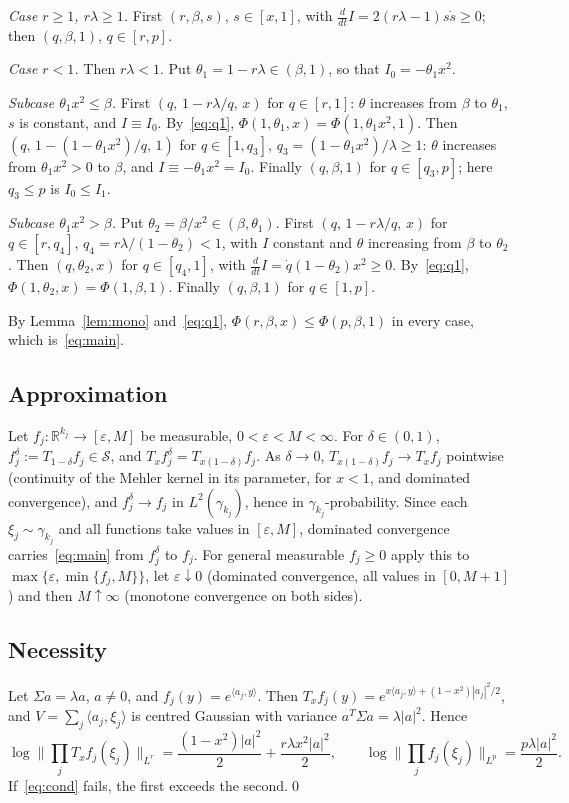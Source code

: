 \documentclass[11pt]{amsart}
\theoremstyle{definition}
\newcommand{\R}{\mathbb{R}}
\newcommand{\cS}{\mathcal{S}}
\begin{document}
\emph{Case $r\ge1$, $r\lambda\ge1$.} First $(r,\beta,s)$, $s\in[x,1]$, with $\frac{d}{dt}I=2(r\lambda-1)s\dot s\ge0$;
then $(q,\beta,1)$, $q\in[r,p]$.

\emph{Case $r<1$.} Then $r\lambda<1$. Put $\theta_1=1-r\lambda\in(\beta,1)$, so that $I_0=-\theta_1x^2$.

\emph{Subcase $\theta_1x^2\le\beta$.} First $(q,\,1-r\lambda/q,\,x)$ for $q\in[r,1]$: $\theta$ increases from $\beta$
to $\theta_1$, $s$ is constant, and $I\equiv I_0$. By~\eqref{eq:q1}, $\Phi(1,\theta_1,x)=\Phi(1,\theta_1x^2,1)$. Then
$(q,\,1-(1-\theta_1x^2)/q,\,1)$ for $q\in[1,q_3]$, $q_3=(1-\theta_1x^2)/\lambda\ge1$: $\theta$ increases from
$\theta_1x^2>0$ to $\beta$, and $I\equiv-\theta_1x^2=I_0$. Finally $(q,\beta,1)$ for $q\in[q_3,p]$; here $q_3\le p$ is
$I_0\le I_1$.

\emph{Subcase $\theta_1x^2>\beta$.} Put $\theta_2=\beta/x^2\in(\beta,\theta_1)$. First $(q,\,1-r\lambda/q,\,x)$ for
$q\in[r,q_4]$, $q_4=r\lambda/(1-\theta_2)<1$, with $I$ constant and $\theta$ increasing from $\beta$ to $\theta_2$.
Then $(q,\theta_2,x)$ for $q\in[q_4,1]$, with $\frac{d}{dt}I=\dot q(1-\theta_2)x^2\ge0$. By~\eqref{eq:q1},
$\Phi(1,\theta_2,x)=\Phi(1,\beta,1)$. Finally $(q,\beta,1)$ for $q\in[1,p]$.

By Lemma~\ref{lem:mono} and~\eqref{eq:q1}, $\Phi(r,\beta,x)\le\Phi(p,\beta,1)$ in every case, which is~\eqref{eq:main}.

\subsection{Approximation}\label{sec:approx}
Let $f_j:\R^{k_j}\to[\varepsilon,M]$ be measurable, $0<\varepsilon<M<\infty$. For $\delta\in(0,1)$,
$f_j^\delta:=T_{1-\delta}f_j\in\cS$, and $T_xf_j^\delta=T_{x(1-\delta)}f_j$. As $\delta\to0$, $T_{x(1-\delta)}f_j\to T_xf_j$
pointwise (continuity of the Mehler kernel in its parameter, for $x<1$, and dominated convergence), and
$f_j^\delta\to f_j$ in $L^2(\gamma_{k_j})$, hence in $\gamma_{k_j}$-probability. Since each $\xi_j\sim\gamma_{k_j}$ and all
functions take values in $[\varepsilon,M]$, dominated convergence carries~\eqref{eq:main} from $f_j^\delta$ to $f_j$.
For general measurable $f_j\ge0$ apply this to $\max\{\varepsilon,\min\{f_j,M\}\}$, let $\varepsilon\downarrow0$ (dominated
convergence, all values in $[0,M+1]$) and then $M\uparrow\infty$ (monotone convergence on both sides).

\subsection{Necessity}
Let $\Sigma a=\lambda a$, $a\ne0$, and $f_j(y)=e^{\langle a_j,y\rangle}$. Then
$T_xf_j(y)=e^{x\langle a_j,y\rangle+(1-x^2)|a_j|^2/2}$, and $V=\sum_j\langle a_j,\xi_j\rangle$ is centred Gaussian with
variance $a^T\Sigma a=\lambda|a|^2$. Hence
\[
\log\Big\|\prod_jT_xf_j(\xi_j)\Big\|_{L^r}=\frac{(1-x^2)|a|^2}2+\frac{r\lambda x^2|a|^2}2,\qquad
\log\Big\|\prod_jf_j(\xi_j)\Big\|_{L^p}=\frac{p\lambda|a|^2}2 .
\]
If~\eqref{eq:cond} fails, the first exceeds the second.\qed
\end{document}
